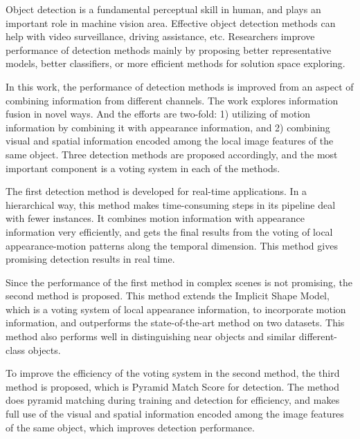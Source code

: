 \begin{eabstract}


Object detection is a fundamental perceptual skill in human, and plays an important role in machine vision area. Effective object detection methods can help with video surveillance, driving assistance, etc. Researchers improve performance of detection methods mainly by proposing better representative models, better classifiers, or more efficient methods for  solution space exploring.

In this work, the performance of detection methods is improved from an aspect of combining information from different channels. The work explores information fusion in novel ways. And the efforts are two-fold: 1) utilizing of motion information by combining it with appearance information, and 2) combining visual and spatial information encoded among the local image features of the same object. Three detection methods are proposed accordingly, and the most important component is a voting system in each of the methods.

The first detection method is developed for real-time applications. In a hierarchical way, this method makes time-consuming steps in its pipeline deal with fewer instances. It
combines motion information with appearance information very efficiently, and gets the final results from the voting of local appearance-motion patterns along the temporal dimension.  This method gives promising detection results in real time.

Since the performance of the first method in complex scenes is not promising, the second method is proposed. This method extends the Implicit Shape Model, which is a voting system of local appearance information, to incorporate motion information, and outperforms the state-of-the-art method on two datasets. This method also performs well in distinguishing near objects and similar different-class objects.


To improve the efficiency of the voting system in the second method, the third method is proposed, which is Pyramid Match Score for detection. The method does pyramid matching during training and detection for efficiency, and makes full use of the visual and spatial  information encoded among the image features of the same object, which improves detection performance.
\end{eabstract}



